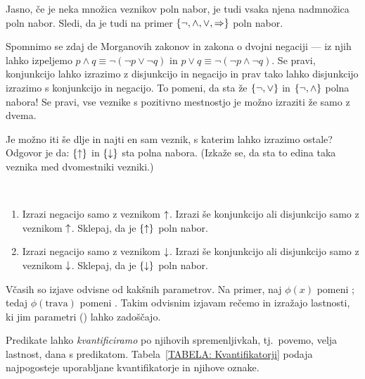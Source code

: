 		Jasno, če je neka množica veznikov poln nabor, je tudi vsaka njena nadmnožica poln nabor. Sledi, da je tudi na primer $\set{\lnot, \land, \lor, \impl}$ poln nabor.
		
		Spomnimo se zdaj de Morganovih zakonov in zakona o dvojni negaciji --- iz njih lahko izpeljemo $p \land q \equiv \lnot(\lnot{p} \lor \lnot{q})$ in $p \lor q \equiv \lnot(\lnot{p} \land \lnot{q})$. Se pravi, konjunkcijo lahko izrazimo z disjunkcijo in negacijo in prav tako lahko disjunkcijo izrazimo s konjunkcijo in negacijo. To pomeni, da sta že $\set{\lnot, \lor}$ in $\set{\lnot, \land}$ polna nabora! Se pravi, vse veznike s pozitivno mestnostjo je možno izraziti že samo z dvema.
		
		Je možno iti še dlje in najti en sam veznik, s katerim lahko izrazimo ostale? Odgovor je da: $\set{\shf}$ in $\set{\luk}$ sta polna nabora. (Izkaže se, da sta to edina taka veznika med dvomestniki vezniki.)
		
		\begin{vaja}\label{VAJA: polni nabori z enim veznikom}
			\
			\begin{enumerate}
				\item
					Izrazi negacijo samo z veznikom $\mathbin{\uparrow}$. Izrazi še konjunkcijo ali disjunkcijo samo z veznikom $\mathbin{\uparrow}$. Sklepaj, da je $\set{\shf}$ poln nabor.
				\item
					Izrazi negacijo samo z veznikom $\mathbin{\downarrow}$. Izrazi še konjunkcijo ali disjunkcijo samo z veznikom $\mathbin{\downarrow}$. Sklepaj, da je $\set{\luk}$ poln nabor.
			\end{enumerate}
		\end{vaja}
		
		
		Včasih so izjave odvisne od kakšnih parametrov. Na primer, naj $\phi(x)$ pomeni ; tedaj $\phi(\text{trava})$ pomeni . Takim odvisnim izjavam rečemo  in izražajo lastnosti, ki jim parametri () lahko zadoščajo.
		
		
		Predikate lahko \emph{kvantificiramo} po njihovih spremenljivkah, tj.~povemo,  velja lastnost, dana s predikatom. Tabela~\ref{TABELA: Kvantifikatorji} podaja najpogosteje uporabljane kvantifikatorje in njihove oznake.
		
